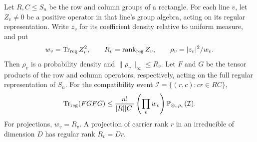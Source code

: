 \begin{lemma}\label{lem:coefficient-compatibility}
Let $R,C\le S_n$ be the row and column groups of a rectangle.
For each line $v$, let $Z_v\ne0$ be a positive operator in that
line's group algebra, acting on its regular representation. Write
$z_v$ for its coefficient density relative to uniform measure, and put
\[
 w_v=\operatorname{Tr}_{\rm reg}Z_v^2,\qquad
 R_v=\operatorname{rank}_{\rm reg}Z_v,\qquad
 \rho_v=|z_v|^2/w_v.
\]
Then $\rho_v$ is a probability density and $\|\rho_v\|_\infty\le R_v$.
Let $F$ and $G$ be the tensor products of the row and column operators,
respectively, acting on the full regular representation of $S_n$.
For the compatibility event $\mathcal I=\{(r,c):cr\in RC\}$,
\begin{equation}\label{e:positive-coefficient-probability}
 \operatorname{Tr}_{\rm reg}(FGFG)
 \le\frac{n!}{|R||C|}\left(\prod_vw_v\right)
       \mathbb P_{\otimes_v\rho_v}(\mathcal I).
\end{equation}
For projections, $w_v=R_v$. A projection of carrier rank $r$ in an
irreducible of dimension $D$ has regular rank $R_v=Dr$.
\end{lemma}
